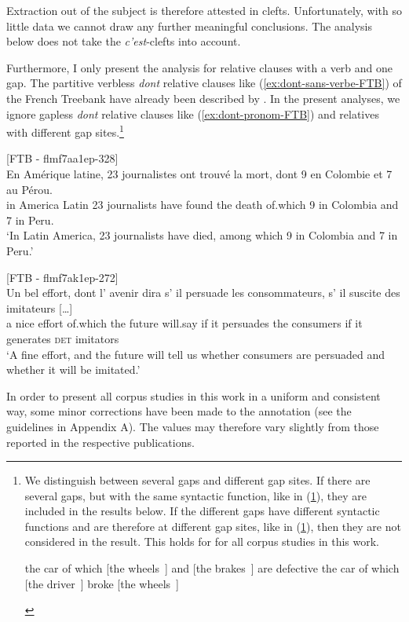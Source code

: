 Extraction out of the subject is therefore attested in clefts. Unfortunately, with so little data we cannot draw any further meaningful conclusions. The analysis below does not take the \emph{c'est}-clefts into account.

Furthermore, I only present the analysis for relative clauses with a verb and one gap. The partitive verbless \emph{dont} relative clauses like (\ref{ex:dont-sans-verbe-FTB}) of the French Treebank have already been described by \citet{Bilbiie.2010}. In the present analyses, we ignore gapless \emph{dont} relative clauses like (\ref{ex:dont-pronom-FTB}) and relatives with different gap sites.\footnote{We distinguish between several gaps and different gap sites. If there are several gaps, but with the same syntactic function, like in (\ref{ex:several-gaps-good}), they are included in the results below. If the different gaps have different syntactic functions and are therefore at different gap sites, like in (\ref{ex:several-gaps-bad}), then they are not considered in the result. This holds for for all corpus studies in this work.

\begin{exe}\ex
\begin{xlist}
\ex the car of which [the wheels~\trace{}] and [the brakes~\trace{}] are defective
\label{ex:several-gaps-good}
\ex the car of which [the driver~\trace{}] broke [the wheels~\trace{}]
\label{ex:several-gaps-bad}
\end{xlist}
\end{exe}
}

\ea {}[FTB - flmf7aa1ep-328]\\
\gll En Amérique latine, 23 journalistes ont trouvé la mort, dont 9 en Colombie et 7 au Pérou.\\
in America Latin 23 journalists have found the death of.which 9 in Colombia and 7 in Peru.\\
\glt `In Latin America, 23 journalists have died, among which 9 in Colombia and 7 in Peru.'
\label{ex:dont-sans-verbe-FTB}
\z 

\ea {}[FTB - flmf7ak1ep-272]\\
\gll Un  bel  effort,  dont  l' avenir  dira  s' il  persuade  les  consommateurs,  s' il  suscite  des  imitateurs [\dots]\\
a nice effort of.which the future will.say if it persuades the consumers if it generates \textsc{det} imitators\\
\glt `A fine effort, and the future will tell us whether consumers are persuaded and whether it will be imitated.'
\label{ex:dont-pronom-FTB}
\z 

In order to present all corpus studies in this work in a uniform and consistent way, some minor corrections have been made to the annotation (see the guidelines in Appendix A). The values may therefore vary slightly from those reported in the respective publications.
